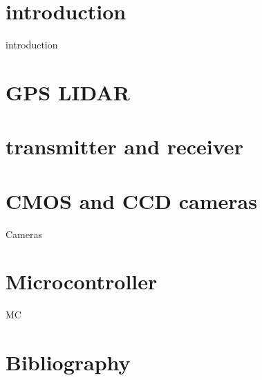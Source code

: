 \documentclass{article}
\begin{document}
\tableofcontents
\clearpage

\section{introduction}
{introduction}
\clearpage

\section{GPS LIDAR}

\section{transmitter and receiver}

\section{CMOS and CCD cameras}
{Cameras}
\clearpage

\section{Microcontroller}
{MC}
\clearpage

\section{Bibliography}
\end{document}

